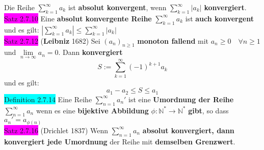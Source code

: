 \documentclass[landscape, 10pt]{article}
\newcommand{\N}{\mathbb{N}}
\begin{document}
\begin{multicols}{3}
                     Die Reihe 
                     \textcolor{NavyBlue}{
                     $\sum_{k=1}^\infty a_k$} ist 
                     \textbf{absolut konvergent}, 
                     wenn \textcolor{NavyBlue}{
                     $\sum_{k=1}^\infty |a_k|$} 
                     \textbf{konvergiert}.\\
              \colorbox{magenta}{Satz 2.7.10} 
                     Eine \textbf{absolut konvergente Reihe} 
                     \textcolor{NavyBlue}{$\sum_{k=1}^\infty a_k$}
                     ist \textbf{auch konvergent} und es gilt:
                     \textcolor{NavyBlue}{
                     $|\sum_{k=1}^\infty a_k|
                     \leqslant\sum_{k=1}^\infty |a_k|$}\\
              \colorbox{magenta}{Satz 2.7.12} 
              (\textbf{Leibniz} 1682) 
                     Sei \textcolor{NavyBlue}{
                     $(a_n)_{n\geqslant1}$}
                     \textbf{monoton fallend} 
                     mit \textcolor{NavyBlue}{
                     $a_n\geqslant0\quad\forall n\geqslant1$} und 
                     \textcolor{NavyBlue}{
                     $\lim\limits_{n\to\infty}a_n=0$}. 
                     Dann \textbf{konvergiert} 
                     \begin{equation*}
                            S:=\sum_{k=1}^\infty (-1)^{k+1}a_k
                     \end{equation*}
                     und es gilt: 
                     \begin{equation*}
                            a_1-a_2\leqslant S\leqslant a_1
                     \end{equation*}
              \colorbox{cyan}{Definition 2.7.14} 
                     Eine Reihe \textcolor{NavyBlue}{$\sum_{n=1}^\infty a_n'$} 
                     ist eine 
                     \textbf{Umordnung der Reihe} 
                     \textcolor{NavyBlue}{$\sum_{n=1}^\infty a_n$} 
                     wenn es eine \textbf{bijektive Abbildung} 
                     \textcolor{NavyBlue}{$\phi :\N^*\longrightarrow\N^*$} 
                     \textbf{gibt}, so dass 
                     \textcolor{NavyBlue}{$a_n'=a_{\phi(n)}$}\\
              \colorbox{magenta}{Satz 2.7.16} 
              (Drichlet 1837) Wenn 
                     \textcolor{NavyBlue}{$\sum_{n=1}^\infty a_n$} \textbf{absolut 
                     konvergiert, dann konvergiert jede Umordnung} der Reihe 
                     mit \textbf{demselben Grenzwert}.\\

\end{multicols}
\end{document}

